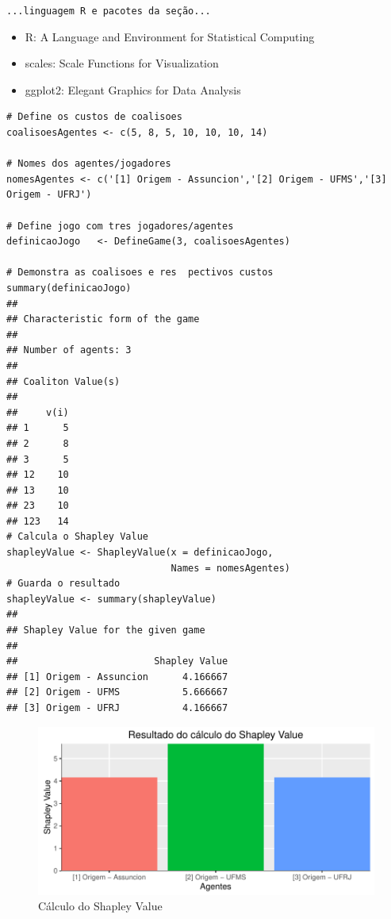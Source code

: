 \documentclass[
	article,			        %
	11pt,				          %
	oneside,			        %
	a4paper,			        %
	english,			        %
	brazil,				        %
	sumario=tradicional
]{abntex2}\usepackage[]{graphicx}\usepackage[]{color}
\makeatletter
\def\maxwidth{ %
  \ifdim\Gin@nat@width>\linewidth
    \linewidth
  \else
    \Gin@nat@width
  \fi
}
\newenvironment{kframe}{%
 \def\at@end@of@kframe{}%
 \ifinner\ifhmode%
  \def\at@end@of@kframe{\end{minipage}}%
  \begin{minipage}{\columnwidth}%
 \fi\fi%
 \def\FrameCommand##1{\hskip\@totalleftmargin \hskip-\fboxsep
 \colorbox{shadecolor}{##1}\hskip-\fboxsep
     \hskip-\linewidth \hskip-\@totalleftmargin \hskip\columnwidth}%
 \MakeFramed {\advance\hsize-\width
   \@totalleftmargin\z@ \linewidth\hsize
   \@setminipage}}%
 {\par\unskip\endMakeFramed%
 \at@end@of@kframe}
\newenvironment{knitrout}{}{} %
\makeatother
\begin{document}
  \texttt{\color{red}...linguagem R e pacotes da seção...}
  \begin{itemize}
    \item R: A Language and Environment for Statistical Computing \cite{R.2016}
    \item scales: Scale Functions for Visualization \cite{Wickham.2015}
    \item ggplot2: Elegant Graphics for Data Analysis \cite{Wickham.2009}
  \end{itemize}

\begin{knitrout}
\color{fgcolor}\begin{kframe}
\begin{verbatim}
# Define os custos de coalisoes
coalisoesAgentes <- c(5, 8, 5, 10, 10, 10, 14)

# Nomes dos agentes/jogadores
nomesAgentes <- c('[1] Origem - Assuncion','[2] Origem - UFMS','[3] Origem - UFRJ')

# Define jogo com tres jogadores/agentes
definicaoJogo   <- DefineGame(3, coalisoesAgentes)

# Demonstra as coalisoes e res  pectivos custos
summary(definicaoJogo)
## 
## Characteristic form of the game 
## 
## Number of agents: 3 
## 
## Coaliton Value(s) 
## 
##     v(i)
## 1      5
## 2      8
## 3      5
## 12    10
## 13    10
## 23    10
## 123   14
# Calcula o Shapley Value
shapleyValue <- ShapleyValue(x = definicaoJogo, 
                             Names = nomesAgentes)
# Guarda o resultado
shapleyValue <- summary(shapleyValue)
## 
## Shapley Value for the given game 
## 
##                        Shapley Value
## [1] Origem - Assuncion      4.166667
## [2] Origem - UFMS           5.666667
## [3] Origem - UFRJ           4.166667
\end{verbatim}
\end{kframe}
\end{knitrout}

\begin{knitrout}
\color{fgcolor}\begin{figure}[H]

{\centering \includegraphics[width=\maxwidth]{figure/unnamed-chunk-4-1} 

}

\caption[Cálculo do Shapley Value]{Cálculo do Shapley Value}\label{fig:unnamed-chunk-4}
\end{figure}


\end{knitrout}
\end{document}
